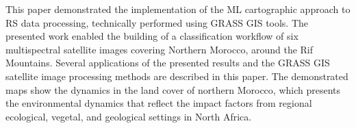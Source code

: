 \documentclass[geomatics,article,accept,pdftex,oneauthor]{Definitions/mdpi}
\begin{document}
This paper demonstrated the implementation of the ML cartographic approach to RS data processing, technically performed using GRASS GIS tools. The presented work enabled the building of a classification workflow of six multispectral satellite images covering Northern Morocco, around the Rif Mountains. Several applications of the presented results and the GRASS GIS satellite image processing methods are described in this paper. The demonstrated maps show the dynamics in the land cover of northern Morocco, which presents the environmental dynamics that reflect the impact factors from regional ecological, vegetal, and geological settings in North Africa.









\end{document}
